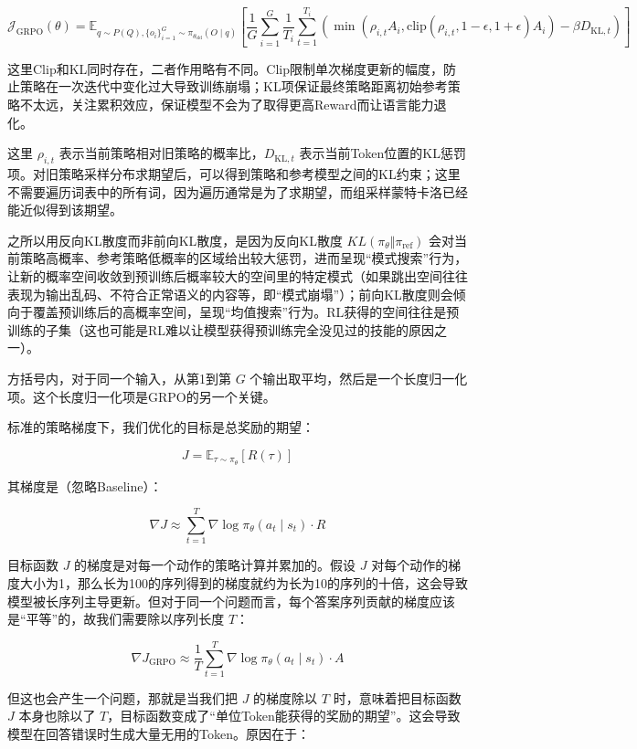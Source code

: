 \[
\mathcal{J}_{\mathrm{GRPO}}(\theta)=
\mathbb{E}_{q\sim P(Q),\{o_i\}_{i=1}^{G}\sim\pi_{\theta_{\mathrm{old}}}(O\mid q)}
\left[
\frac{1}{G}\sum_{i=1}^{G}\frac{1}{T_i}\sum_{t=1}^{T_i}
\left(
\min(\rho_{i,t}A_i,\mathrm{clip}(\rho_{i,t},1-\epsilon,1+\epsilon)A_i)-\beta D_{\mathrm{KL},t}
\right)
\right]
\]

这里Clip和KL同时存在，二者作用略有不同。Clip限制单次梯度更新的幅度，防止策略在一次迭代中变化过大导致训练崩塌；KL项保证最终策略距离初始参考策略不太远，关注累积效应，保证模型不会为了取得更高Reward而让语言能力退化。

这里 \(\rho_{i,t}\) 表示当前策略相对旧策略的概率比，\(D_{\mathrm{KL},t}\) 表示当前Token位置的KL惩罚项。对旧策略采样分布求期望后，可以得到策略和参考模型之间的KL约束；这里不需要遍历词表中的所有词，因为遍历通常是为了求期望，而组采样蒙特卡洛已经能近似得到该期望。

之所以用反向KL散度而非前向KL散度，是因为反向KL散度 \(KL(\pi_{\theta}\Vert\pi_{\mathrm{ref}})\) 会对当前策略高概率、参考策略低概率的区域给出较大惩罚，进而呈现``模式搜索''行为，让新的概率空间收敛到预训练后概率较大的空间里的特定模式（如果跳出空间往往表现为输出乱码、不符合正常语义的内容等，即``模式崩塌''）；前向KL散度则会倾向于覆盖预训练后的高概率空间，呈现``均值搜索''行为。RL获得的空间往往是预训练的子集（这也可能是RL难以让模型获得预训练完全没见过的技能的原因之一）。

方括号内，对于同一个输入，从第1到第 \(G\) 个输出取平均，然后是一个长度归一化项。这个长度归一化项是GRPO的另一个关键。

标准的策略梯度下，我们优化的目标是总奖励的期望：

\[
J=\mathbb{E}_{\tau\sim\pi_{\theta}}[R(\tau)]
\]

其梯度是（忽略Baseline）：

\[
\nabla J\approx \sum_{t=1}^{T}\nabla\log\pi_{\theta}(a_t\mid s_t)\cdot R
\]

目标函数 \(J\) 的梯度是对每一个动作的策略计算并累加的。假设 \(J\) 对每个动作的梯度大小为1，那么长为100的序列得到的梯度就约为长为10的序列的十倍，这会导致模型被长序列主导更新。但对于同一个问题而言，每个答案序列贡献的梯度应该是``平等''的，故我们需要除以序列长度 \(T\)：

\[
\nabla J_{\mathrm{GRPO}}\approx \frac{1}{T}\sum_{t=1}^{T}\nabla\log\pi_{\theta}(a_t\mid s_t)\cdot A
\]

但这也会产生一个问题，那就是当我们把 \(J\) 的梯度除以 \(T\) 时，意味着把目标函数 \(J\) 本身也除以了 \(T\)，目标函数变成了``单位Token能获得的奖励的期望''。这会导致模型在回答错误时生成大量无用的Token。原因在于：


